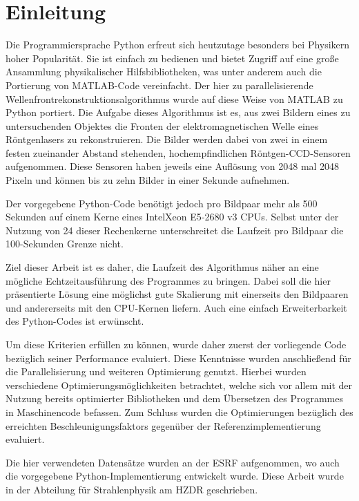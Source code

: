 \chapter{Einleitung}

Die Programmiersprache Python erfreut sich heutzutage besonders bei Physikern hoher Popularität. Sie ist einfach zu bedienen und bietet Zugriff auf eine große Ansammlung physikalischer Hilfsbibliotheken, was unter anderem auch die Portierung von MATLAB-Code vereinfacht. Der hier zu parallelisierende Wellenfrontrekonstruktionsalgorithmus wurde auf diese Weise von MATLAB zu Python portiert. Die Aufgabe dieses Algorithmus ist es, aus zwei Bildern eines zu untersuchenden Objektes die Fronten der elektromagnetischen Welle eines Röntgenlasers zu rekonstruieren. Die Bilder werden dabei von zwei in einem festen zueinander Abstand stehenden, hochempfindlichen Röntgen-\gls{CCD}-Sensoren aufgenommen. Diese Sensoren haben jeweils eine Auflösung von 2048 mal 2048 Pixeln und können bis zu zehn Bilder in einer Sekunde aufnehmen. 

Der vorgegebene Python-Code benötigt jedoch pro Bildpaar mehr als 500 Sekunden auf einem Kerne eines Intel\textregistered \mbox{Xeon\textregistered} E5-2680 v3 \glspl{CPU}. Selbst unter der Nutzung von 24 dieser Rechenkerne unterschreitet die Laufzeit pro Bildpaar die 100-Sekunden Grenze nicht.

Ziel dieser Arbeit ist es daher, die Laufzeit des Algorithmus näher an eine mögliche Echtzeitausführung des Programmes zu bringen. Dabei soll die hier präsentierte Lösung eine möglichst gute Skalierung mit einerseits den Bildpaaren und andererseits mit den \gls{CPU}-Kernen liefern. Auch eine einfach Erweiterbarkeit des Python-Codes ist erwünscht. 

Um diese Kriterien erfüllen zu können, wurde daher zuerst der vorliegende Code bezüglich seiner Performance evaluiert. Diese Kenntnisse wurden anschließend für die Parallelisierung und weiteren Optimierung genutzt. Hierbei wurden verschiedene Optimierungsmöglichkeiten betrachtet, welche sich vor allem mit der Nutzung bereits optimierter Bibliotheken und dem Übersetzen des Programmes in Maschinencode befassen. Zum Schluss wurden die Optimierungen bezüglich des erreichten Beschleunigungsfaktors gegenüber der Referenzimplementierung evaluiert.

Die hier verwendeten Datensätze wurden an der \gls{ESRF} aufgenommen, wo auch die vorgegebene Python-Implementierung entwickelt wurde. Diese Arbeit wurde in der Abteilung für Strahlenphysik am \gls{HZDR} geschrieben. 








